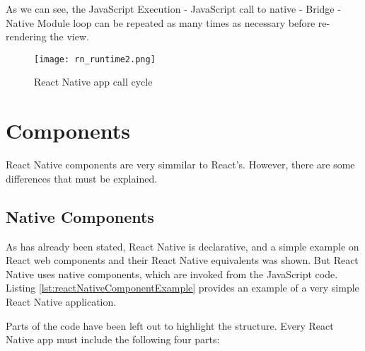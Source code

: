 As we can see, the JavaScript Execution - JavaScript call to native - Bridge - Native Module loop can be repeated as many times as necessary before re-rendering the view.~\cite{runtimeconference}

\begin{figure}[H]
	\centering
	\texttt{[image: rn\_runtime2.png]}
	\caption{React Native app call cycle\label{fig:rnruntime2}}
\end{figure}

\section{Components}

React Native components are very simmilar to React's. However, there are some differences that must be explained.

\subsection{Native Components}
\label{subsec:nativecomps}

As has already been stated, React Native is declarative, and a simple example on React web components and their React Native equivalents was shown. But React Native uses native components, which are invoked from the JavaScript code. Listing \ref{lst:reactNativeComponentExample} provides an example of a very simple React Native application.

\lstset{style=myhtml}


Parts of the code have been left out to highlight the structure. Every React Native app must include the following four parts:

